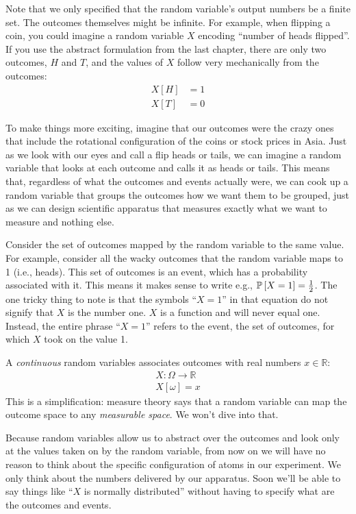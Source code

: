 Note that we only specified that the random variable's output numbers be a
finite set. The outcomes themselves might be infinite. For example, when
flipping a coin, you could imagine a random variable $X$ encoding ``number of
heads flipped''. If you use the abstract formulation from the last chapter,
there are only two outcomes, $H$ and $T$, and the values of $X$ follow very
mechanically from the outcomes:
\begin{align*}
X[H] &= 1 \\
X[T] &= 0
\end{align*}

To make things more exciting, imagine that our outcomes were the crazy ones
that include the rotational configuration of the coins or stock prices in
Asia. Just as we look with our eyes and call a flip heads or tails, we can
imagine a random variable that looks at each outcome and calls it as heads or
tails. This means that, regardless of what the outcomes and events actually
were, we can cook up a random variable that groups the outcomes how we want
them to be grouped, just as we can design scientific apparatus that measures
exactly what we want to measure and nothing else.

Consider the set of outcomes mapped by the random variable to the same value.
For example, consider all the wacky outcomes that the random variable maps to
1 (i.e., heads). This set of outcomes is an event, which has a probability
associated with it. This means it makes sense to write e.g., $\mathbb{P}\left[{X = 1}\right] =
\tfrac{1}{2}$. The one tricky thing to note is that the symbols ``$X = 1$'' in
that equation do not signify that $X$ is the number one. $X$ is a function and
will never equal one. Instead, the entire phrase ``$X = 1$'' refers to the
event, the set of outcomes, for which $X$ took on the value 1.

A \emph{continuous} random variables associates outcomes with real
numbers $x \in \mathbb{R}$:
\begin{gather*}
X : \Omega \to \mathbb{R} \\
X[\omega] = x
\end{gather*}
This is a simplification: measure theory says that a random variable can map
the outcome space to any \emph{measurable space}. We won't dive into that.

Because random variables allow us to abstract over the outcomes and look only
at the values taken on by the random variable, from now on we will have no
reason to think about the specific configuration of atoms in our experiment.
We only think about the numbers delivered by our apparatus. Soon we'll be able
to say things like ``$X$ is normally distributed'' without having to specify
what are the outcomes and events.

